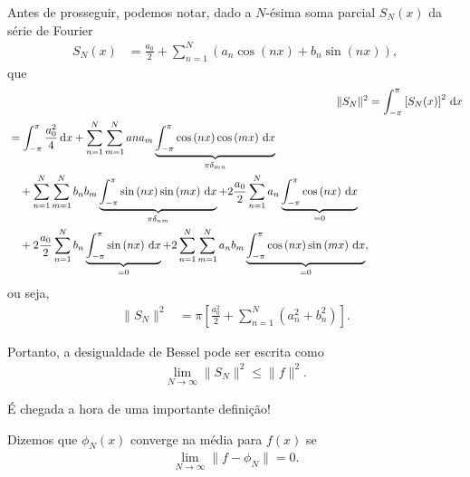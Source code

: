Antes de prosseguir, podemos notar, dado a $N$-\'{e}sima soma parcial $S_N(x)$ da s\'{e}rie de Fourier
\begin{align*}
    S_N(x) &= \frac{a_0}{2} + \sum_{n = 1}^N \left( a_n \cos\left( n x \right) + b_n \sin\left( n x \right) \right),
\end{align*}
que
\begin{align*}
    \| S_N \|^2 &= \int_{-\pi}^\pi \left[ S_N(x) \right]^2 \, \mathrm{d}x \\
    \begin{split}
        &= \int_{-\pi}^\pi \frac{a_0^2}{4} \, \mathrm{d}x + \sum_{n = 1}^N \sum_{m = 1}^N an a_m \underbrace{\int_{-\pi}^\pi \cos\left( n x \right) \cos\left( m x \right) \, \mathrm{d}x}_{\pi \delta_{mn}} \\
        &\quad {}+ \sum_{n = 1}^N \sum_{m = 1}^N b_n b_m \underbrace{\int_{-\pi}^\pi \sin\left( n x \right) \sin\left( m x \right) \, \mathrm{d}x}_{\pi \delta_{nm}} + 2 \frac{a_0}{2} \sum_{n = 1}^N a_n \underbrace{\int_{-\pi}^\pi \cos\left( n x \right) \, \mathrm{d}x}_{= 0} \\
        &\quad {}+ 2 \frac{a_0}{2} \sum_{n = 1}^N b_n \underbrace{\int_{-\pi}^\pi \sin\left( n x \right) \, \mathrm{d}x}_{= 0} + 2 \sum_{n = 1}^N \sum_{m = 1}^N a_n b_m \underbrace{\int_{-\pi}^\pi \cos\left( n x \right) \sin\left( m x \right) \, \mathrm{d}x}_{= 0},
    \end{split}
\end{align*}
ou seja,
\begin{align*}
    \| S_N \|^2 &= \pi \left[ \frac{a_0^2}{2} + \sum_{n = 1}^N \left( a_n^2 + b_n^2 \right) \right].
\end{align*}

Portanto, a desigualdade de Bessel pode ser escrita como
\begin{align*}
    \lim_{N \to \infty} \| S_N \|^2 \leq \| f \|^2.
\end{align*}

\'{E} chegada a hora de uma importante defini\c{c}\~{a}o!

\begin{defi}
    Dizemos que $\phi_N(x)$ converge na m\'{e}dia para $f(x)$ se
    \begin{align*}
        \lim_{N \to \infty} \| f - \phi_N \| = 0.
    \end{align*}
\end{defi}

